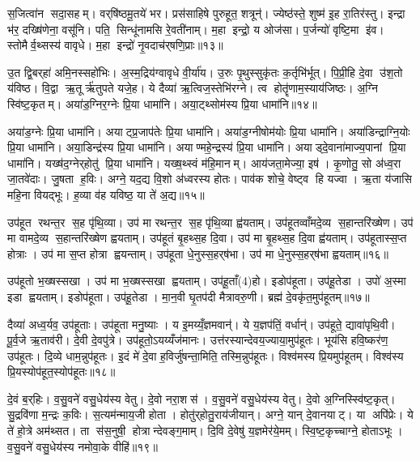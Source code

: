 स॒जित्वा॑न सदा॒सहम्। वर्‌षि॑ष्ठमू॒तये॑ भर। प्रस॑साहिषे पुरुहूत॒ शत्रून्॑। ज्येष्ठ॑स्ते॒ शुष्म॑ इ॒ह रा॒तिर॑स्तु। इन्द्रा भ॑र॒ दख्षि॑णेना॒ वसू॑नि। पति॒ सिन्धू॑नामसि रे॒वती॑नाम्। म॒हा इन्द्रो॒ य ओज॑सा। प॒र्जन्यो॑ वृष्टि॒मा इ॑व। स्तोमैर्व॒थ्सस्य॑ वावृधे। म॒हा इन्द्रो॑ नृ॒वदाच॑र्‌षणि॒प्राः॥१३॥

उ॒त द्वि॒बर्‌हा॑ अमि॒नस्सहो॑भिः। अ॒स्म॒द्रिय॑ग्वावृधे वी॒र्या॑य। उ॒रुः पृ॒थुस्सुकृ॑तः क॒र्तृभि॑र्भूत्। पि॒प्री॒हि दे॒वा उ॑श॒तो य॑विष्ठ। वि॒द्वा ऋ॒तूर्\mbox{}ऋ॑तुपते यजे॒ह। ये दैव्या॑ ऋ॒त्विज॒स्तेभि॑रग्ने। त्व होतॄ॑णाम॒स्याय॑जिष्ठः। अ॒ग्नि स्वि॑ष्ट॒कृतम्। अया॑ड॒ग्निर॒ग्नेः प्रि॒या धामा॑नि। अया॒ट्थ्सोम॑स्य प्रि॒या धामा॑नि॥१४॥

अया॑ड॒ग्नेः प्रि॒या धामा॑नि। अयाट्प्र॒जाप॑तेः प्रि॒या धामा॑नि। अया॑ड॒ग्नीषोम॑योः प्रि॒या धामा॑नि। अया॑डिन्द्राग्नि॒योः प्रि॒या धामा॑नि। अया॒डिन्द्र॑स्य प्रि॒या धामा॑नि। अयाण्महे॒न्द्रस्य॑ प्रि॒या धामा॑नि। अयाड्दे॒वाना॑माज्य॒पानां प्रि॒या धामा॑नि। यख्ष॑द॒ग्नेर्‌होतु॑ प्रि॒या धामा॑नि। यख्ष॒थ्स्वं म॑हि॒मानम्। आय॑जता॒मेज्या॒ इष॑। कृ॒णोतु॒ सो अ॑ध्व॒रा जा॒तवे॑दाः। जु॒षता ह॒विः। अग्ने॒ यद॒द्य वि॒शो अ॑ध्वरस्य होतः। पाव॑क शोचे॒ वेष्ट्व हि यज्वा। ऋ॒ता य॑जासि महि॒ना वियद्भूः। ह॒व्या व॑ह यविष्ठ॒ या ते॑ अ॒द्य॥१५॥\anuvakamend[अ॒स्त्व॒ध॒त्त॒ र॒यिञ्च॑र्‌षणि॒प्रास्सोम॑स्य प्रि॒या धामा॒नीष॒ष्षट्च॑]

उप॑हूत रथन्त॒र स॒ह पृ॑थि॒व्या। उप॑ मा रथन्त॒र स॒ह पृ॑थि॒व्या ह्व॑यताम्। उप॑हूतव्वाँमदे॒व्य स॒हान्तरि॑ख्षेण। उप॑ मा वामदे॒व्य स॒हान्तरि॑ख्षेण ह्वयताम्। उप॑हूतं बृ॒हथ्स॒ह दि॒वा। उप॑ मा बृ॒हथ्स॒ह दि॒वा ह्व॑यताम्। उप॑हूतास्स॒प्त होत्राः। उप॑ मा स॒प्त होत्रा ह्वयन्ताम्। उप॑हूता धे॒नुस्स॒हर्‌ष॑भा। उप॑ मा धे॒नुस्स॒हर्‌ष॑भा ह्वयताम्॥१६॥

उप॑हूतो भ॒ख्षस्सखा। उप॑ मा भ॒ख्षस्सखा ह्वयताम्। उप॑हू॒ताँ(4)हो। इडोप॑हूता। उप॑हू॒तेडा। उपो॑ अ॒स्मा इडा ह्वयताम्। इडोप॑हूता। उप॑हू॒तेडा। मा॒न॒वी घृ॒तप॑दी मैत्रावरु॒णी। ब्रह्म॑ दे॒वकृ॑त॒मुप॑हूतम्॥१७॥

दैव्या॑ अध्व॒र्यव॒ उप॑हूताः। उप॑हूता मनु॒ष्याः। य इ॒मय्यँ॒ज्ञमवान्॑। ये य॒ज्ञप॑तिं॒ वर्धान्॑। उप॑हूते॒ द्यावा॑पृथि॒वी। पू॒र्व॒जे ऋ॒ताव॑री। दे॒वी दे॒वपु॑त्रे। उप॑हूतो॒ऽयय्यँज॑मानः। उत्त॑रस्यान्देवय॒ज्याया॒मुप॑हूतः। भूय॑सि हवि॒ष्कर॑ण॒ उप॑हूतः। दि॒व्ये धाम॒न्नुप॑हूतः। इ॒दं मे॑ दे॒वा ह॒विर्जु॑षन्ता॒मिति॒ तस्मि॒न्नुप॑हूतः। विश्व॑मस्य प्रि॒यमुप॑हूतम्। विश्व॑स्य प्रि॒यस्योप॑हूत॒स्योप॑हूतः॥१८॥\anuvakamend[स॒हर्‌ष॑भा ह्वयता॒मुप॑हूत हवि॒ष्कर॑ण॒ उप॑हूतश्च॒त्वारि॑ च]

दे॒वं ब॒र्‌हिः। व॒सु॒वने॑ वसु॒धेय॑स्य वेतु। दे॒वो नरा॒शस॑। व॒सु॒वने॑ वसु॒धेय॑स्य वेतु। दे॒वो अ॒ग्निस्स्वि॑ष्ट॒कृत्। सु॒द्रवि॑णा म॒न्द्रः क॒विः। स॒त्यम॑न्माय॒जी होता। होतु॑र्‌होतु॒राय॑जीयान्। अग्ने॒ यान् दे॒वानयाट्। या अपि॑प्रेः। ये ते॑ हो॒त्रे अम॑थ्सत। ता स॑स॒नुषी॒ होत्रान्देवङ्ग॒माम्। दि॒वि दे॒वेषु॑ य॒ज्ञमेर॑ये॒मम्। स्वि॒ष्ट॒कृच्चाग्ने॒ होताऽभूः। व॒सु॒वने॑ वसु॒धेय॑स्य नमोवा॒के वीहि॑॥१९॥\anuvakamend[अपि॑प्रे॒ पञ्च॑ च]

